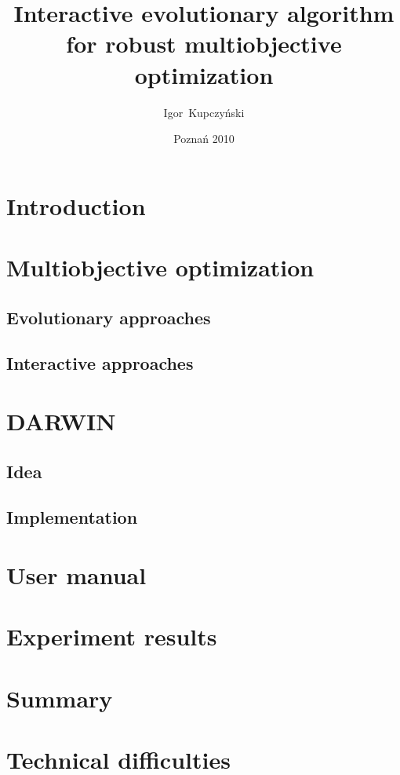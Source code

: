 \documentclass[a4paper,english,thesis]{dcsbook}
\author{Igor~Kupczy\'nski}
\date{Pozna\'n 2010}
\title{Interactive evolutionary algorithm \\ for robust multiobjective
  optimization}
\begin{document}
\maketitle
\frontmatter
\tableofcontents{}
\mainmatter

\chapter{Introduction}

\chapter{Multiobjective optimization}
\section{Evolutionary approaches}
\section{Interactive approaches}

\chapter{DARWIN}
\section{Idea}

\section{Implementation}

\chapter{User manual}

\chapter{Experiment results}

\chapter{Summary}


\backmatter



\appendix
\appendixpage
\addappheadtotoc
\chapter{Technical difficulties}
\end{document}
